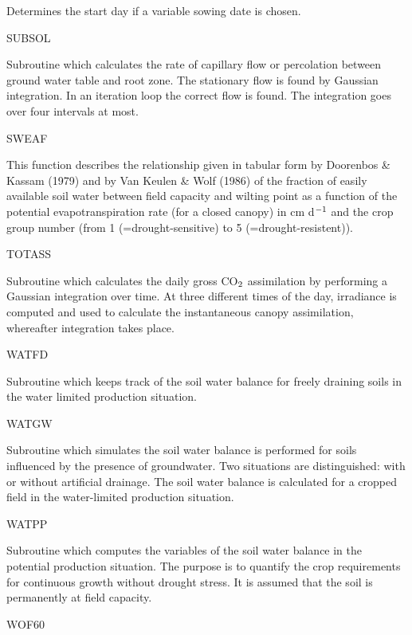 \documentclass[11pt]{article}
\begin{document}
\begin{indenting}{5.08cm}
Determines the start day if a variable sowing date is chosen.
\end{indenting}
SUBSOL
\testlastline

\begin{indenting}{5.08cm}
Subroutine which calculates the rate of capillary flow or
perco\-lation between ground water table and root zone. The
stationary flow is found by Gaussian integrati\-on. In an
iteration loop the correct flow is found. The integrati\-on goes
over four intervals at most.
\end{indenting}
SWEAF
\testlastline

\begin{indenting}{5.08cm}
This function describes the relati\-onship given in tabular form
by Dooren\-bos \& Kas\-sam (1979) and by Van Keulen \& Wolf
(1986) of the fraction of easily available soil water between
field capacity and wilting point as a function of the potential
evapotranspirati\-on rate (for a closed canopy) in cm d$^{{\rm -1}}$ and
the crop group number (from 1 (=drought-sensitive) to 5
(=drought-resistent)).
\end{indenting}
TOTASS
\testlastline

\begin{indenting}{5.08cm}
Subroutine which calculates the daily gross CO$_{{\rm 2}}$ assimilati\-on
by per\-forming a Gaussian integration over time. At three
different times of the day, irradiance is computed and used
to calculate the instantaneous canopy assimilati\-on, whereafter
integration takes place. 
\end{indenting}
WATFD
\testlastline

\begin{indenting}{5.08cm}
Subroutine which keeps track of the soil water balance for
freely draining soils in the water limited production situa\-tion.
\end{indenting}
WATGW
\testlastline

\begin{indenting}{5.08cm}
Subroutine which simulates the soil water balance is per\-formed for soils influenced by the presence of groun\-dwater.
Two situati\-ons are distin\-guished: with or without artificial
drainage. The soil water balance is calculated for a cropped
field in the water-limited production situation.
\end{indenting}
WATPP
\testlastline

\begin{indenting}{5.08cm}
Subroutine which computes the variables of the soil water
balan\-ce in the potential production situation. The purpose is
to quantify the crop requirements for continuous growth
without drought stress. It is assu\-med that the soil is per\-manently at field capacity.
\end{indenting}
WOF60
\testlastline
\end{document}
